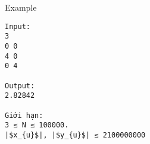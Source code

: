 Example
\begin{verbatim}
Input:
3
0 0
4 0
0 4

Output:
2.82842

Giới hạn:
3 ≤ N ≤ 100000. 
|$x_{u}$|, |$y_{u}$| ≤ 2100000000

\end{verbatim}